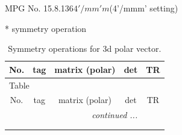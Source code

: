 \documentclass[fleqn,8pt]{jsarticle}
\begin{document}
\setcounter{MaxMatrixCols}{32}

\renewcommand{\tablename}{Table~}
\renewcommand{\figurename}{Figure~}
\begin{center}
\LARGE
MPG No. 15.8.136\quad$4'/mm'm$\quad(4'/mmm' setting)
\end{center}
* symmetry operation
\renewcommand{\arraystretch}{1.3}
\begin{longtable}{ccccc}
\caption{Symmetry operations for 3d polar vector.}
 \\
 \hline \hline
No. & tag & matrix (polar) & det & TR \\ \hline \endfirsthead

\multicolumn{4}{l}{\tablename\ \thetable{}} \\
 \hline \hline
No. & tag & matrix (polar) & det & TR \\ \hline \endhead

 \hline \hline
\multicolumn{4}{r}{\footnotesize\it continued ...} \\ \endfoot

 \hline \hline
\multicolumn{4}{r}{} \\ \endlastfoot


\end{longtable}
\end{document}
